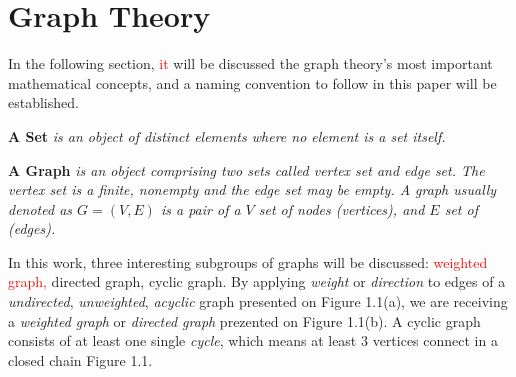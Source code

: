 \section{Graph Theory}\label{sec:theoreticalBackground}
In the following section, \textcolor{red}{it} will be discussed the graph theory's most important mathematical concepts, and a naming convention to follow in this paper will be established. 
\begin{definition}\textbf{A Set} \emph{is an object of distinct elements where no element is a set itself.\cite{Trudeau, 2017} }\end{definition}
\begin{definition}\textbf{A Graph} \emph{is an object comprising two sets called vertex set and edge set. The vertex set is a finite, nonempty and the edge set may be empty. A graph usually denoted as $ G = (V, E)$ is a pair of a $V$ set of nodes (\textit{vertices}), and $E$ set of (\textit{edges}).\cite{Trudeau, 2017} }\end{definition}
\noindent In this work, three interesting subgroups of graphs will be discussed: \textcolor{red}{weighted graph,} directed graph, cyclic graph. By applying \textit{weight} or \textit{direction} to edges of a \textit{undirected}, \textit{unweighted}, \textit{acyclic} graph presented on Figure 1.1(a), we are receiving a \textit{ weighted graph} or \textit{directed graph} prezented on Figure 1.1(b). A cyclic graph consists of at least one single \textit{cycle}, which means at least 3 vertices connect in a closed chain Figure 1.1. 

